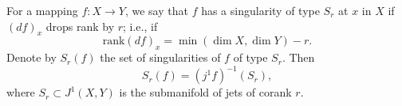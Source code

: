 For a mapping $f: X \rightarrow Y$, we say that $f$ has a singularity of type $S_r$ at $x$ in $X$ if $(df)_x$ drops rank by $r$; i.e., if
$$\text{rank}(df)_x = \min(\dim X, \dim Y) - r.$$
Denote by $S_r(f)$ the set of singularities of $f$ of type $S_r$. Then
$$S_r(f) = (j^1 f)^{-1}(S_r),$$
where $S_r \subset J^1(X, Y)$ is the submanifold of jets of corank $r$.
